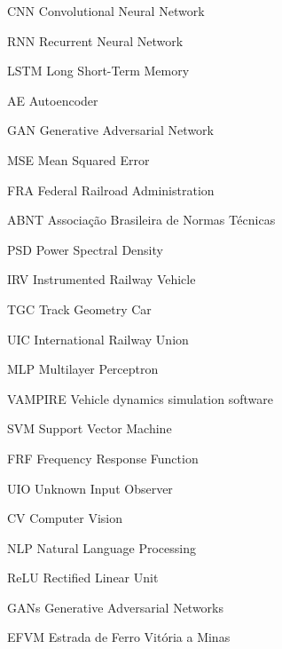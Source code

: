 \documentclass[
	oldfontcommands,
	sumario=abnt-6027-2012,
	12pt,			%
	openright,		%
	oneside,		%
	a4paper,		%
	brazil,			%
	english,		%
	]{imecc-unicamp}
\begin{document}
\begin{siglas}
	\item[CNN] Convolutional Neural Network
	\item[RNN] Recurrent Neural Network
	\item[LSTM] Long Short-Term Memory
	\item[AE] Autoencoder
	\item[GAN] Generative Adversarial Network
	\item[MSE] Mean Squared Error
	\item[FRA] Federal Railroad Administration
	\item[ABNT] Associação Brasileira de Normas Técnicas 
	\item[PSD] Power Spectral Density
	\item[IRV] Instrumented Railway Vehicle
	\item[TGC] Track Geometry Car
	\item[UIC] International Railway Union
	\item[MLP] Multilayer Perceptron
	\item[VAMPIRE] Vehicle dynamics simulation software
	\item[SVM] Support Vector Machine
	\item[FRF] Frequency Response Function
	\item[UIO] Unknown Input Observer
	\item[CV] Computer Vision
	\item[NLP] Natural Language Processing
	\item[ReLU] Rectified Linear Unit
	\item[GANs] Generative Adversarial Networks
	\item[EFVM] Estrada de Ferro Vitória a Minas
\end{siglas}
\end{document}
